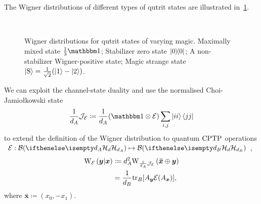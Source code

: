 \documentclass[pra,
aps,
twocolumn,
superscriptaddress,
groupedaddress,
nofootinbib,
reprint
]{revtex4-1}
\begin{document}
The Wigner distributions of different types of qutrit states are illustrated in~\cref{fig:wstate_examples}.
\begin{figure}%
    \centering
    \hspace{8pt}%
    \\
    \hspace{8pt}%
    \caption{Wigner distributions for qutrit states of varying magic. 
     Maximally mixed state $\frac{1}{3}\id$;  Stabilizer zero state $\ketbra{0}{0}$;  A non-stabilizer Wigner-positive state;  Magic strange state $\ket{{\rm{S}}} = \frac{1}{\sqrt{2}}(\ket{1} - \ket{2})$.
    }%
    \label{fig:wstate_examples}
\end{figure}

We can exploit the channel-state duality and use the normalised Choi-Jamio\l{}kowski state 
\begin{equation}\label{eq:cj}
    \frac{1}{d_A}\J_\E \coloneqq \frac{1}{d_A}(\id \otimes \E) \sum_{i,j} \ket{ii}\bra{jj}
\end{equation}
to extend the definition of the Wigner distribution to quantum ${\rm{CPTP}}$ operations $\E: \cal{B}(\hd[d_A]) \mapsto \cal{B}(\hd[d_B])$, 
\begin{align}\label{eq:woperation}
    \W[\bmy|\bmx]{\E} 
    &\coloneqq d_A^2 \W[\bm{\bar x} \oplus \bmy]{\frac{1}{d_A}\J_\E} \\
    &= \frac{1}{d_B} \tr_B[A_{\bmy} \E(A_{\bmx})],
\end{align}
where $\bm{\bar x} \coloneqq (x_0, -x_1)$.
\end{document}
